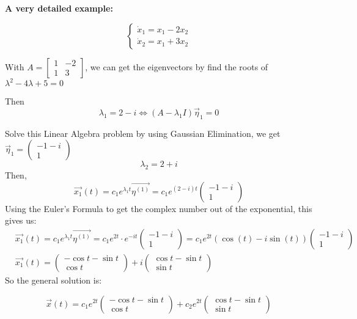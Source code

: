 \documentclass[a4paper]{article}
\begin{document}
{\bf  A very detailed example:}

$$
\left\{\begin{array}{l}
	\dot{x}_{1}=x_{1}-2 x_{2} \\
	\dot{x}_{2}=x_{1}+3 x_{2}
\end{array}\right.
$$

With $A=\left[\begin{array}{ll}1 & -2 \\ 1 & 3\end{array}\right]$, we can get the eigenvectors by find the roots of $\lambda^{2}-4 \lambda+5=0$

Then
$$
\lambda_{1}=2-i \Leftrightarrow\left(A-\lambda_{1} I\right) \vec{\eta}_{1}=0
$$

Solve this Linear Algebra problem by using Gaussian Elimination, we get $\vec{\eta}_{1}=\left(\begin{array}{l}-1-i \\ 1\end{array}\right)$
$$
\lambda_{2}=2+i
$$
Then,
$$
\overrightarrow{x_{1}}(t)=c_{1} e^{\lambda_{1} t} \overrightarrow{\eta^{(1)}}=c_{1} e^{(2-i) t}\left(\begin{array}{l}
	-1-i \\
	1
\end{array}\right)
$$
Using the Euler's Formula to get the complex number out of the exponential, this gives us:
$$
\begin{aligned}
	&\overrightarrow{x_{1}}(t)=c_{1} e^{\lambda_{1} t} \overrightarrow{\eta^{(1)}}=c_{1} e^{2 t} \cdot e^{-i t}\left(\begin{array}{l}
		-1-i \\
		1
	\end{array}\right)=c_{1} e^{2 t}(\cos (t)-i \sin (t))\left(\begin{array}{l}
		-1-i \\
		1
	\end{array}\right) \\
	&\overrightarrow{x_{1}}(t)=\left(\begin{array}{l}
		-\cos t-\sin t \\
		\cos t
	\end{array}\right)+i\left(\begin{array}{l}
		\cos t-\sin t \\
		\sin t
	\end{array}\right)
\end{aligned}
$$
So the general solution is:

$$
\vec{x}(t)=c_{1} e^{2 t}\left(\begin{array}{l}
	-\cos t-\sin t \\
	\cos t
\end{array}\right)+c_{2} e^{2 t}\left(\begin{array}{l}
	\cos t-\sin t \\
	\sin t
\end{array}\right)
$$
\end{document}
